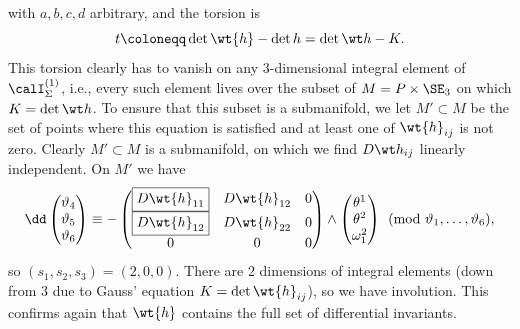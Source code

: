 with $a,b,c,d$ arbitrary, and the torsion is 
\[t\coloneqq \det \wt{h}-\det h=\det\wt h-K.\]
This torsion clearly has to vanish on any $3$-dimensional integral element of $\calI^{(1)}_\Sigma$, i.e., every such element lives over the subset of $M=P\times\SE_3$ on which $K=\det\wt h$. To ensure that this subset is a submanifold, we let $M'\subset M$ be the set of points where this equation is satisfied and at least one of $\wt{h}_{ij}$ is not zero. Clearly $M'\subset M$ is a submanifold, on which we find $D\wt h_{ij}$ linearly independent. On $M'$ we have
\[
    \dd \begin{pmatrix}
        \vartheta_4\\
        \vartheta_5\\
        \vartheta_6
    \end{pmatrix} \equiv 
    -\begin{pmatrix}
        \boxed{D\wt{h}_{11}} & D\wt{h}_{12} & 0\\
        \boxed{D\wt{h}_{12}} & D\wt{h}_{22} & 0\\
        0 & 0 & 0
    \end{pmatrix}\wedge 
    \begin{pmatrix}
        \theta^1\\\theta^2\\\omega^2_1
    \end{pmatrix}\pmod{\vartheta_1,\ldots,\vartheta_6},
\]
so $(s_1,s_2,s_3)=(2,0,0)$. There are $2$ dimensions of integral elements (down from $3$ due to Gauss' equation $K=\det\wt{h}_{ij}$), so we have involution. This confirms again that $\wt{h}$ contains the full set of differential invariants.

